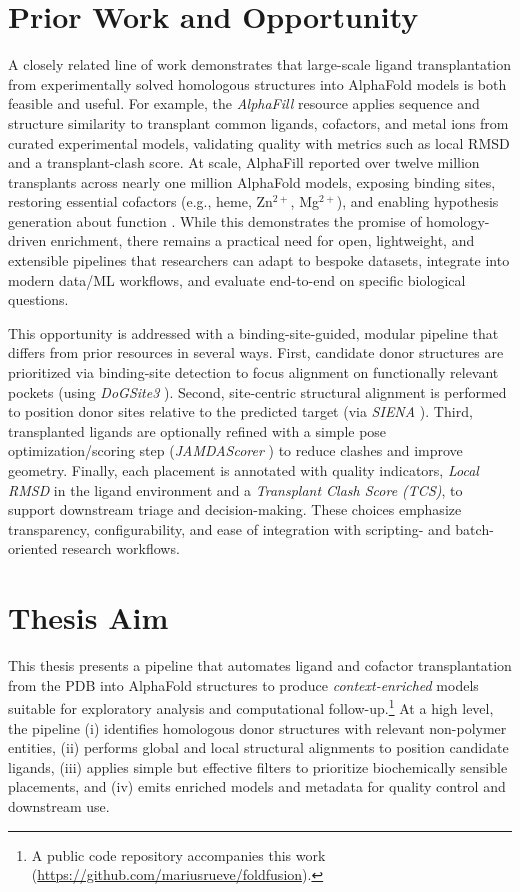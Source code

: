 \section{Prior Work and Opportunity}
A closely related line of work demonstrates that large-scale ligand transplantation from experimentally solved homologous structures into AlphaFold models is both feasible and useful. For example, the \textit{AlphaFill} resource applies sequence and structure similarity to transplant common ligands, cofactors, and metal ions from curated experimental models, validating quality with metrics such as local RMSD and a transplant-clash score. At scale, AlphaFill reported over twelve million transplants across nearly one million AlphaFold models, exposing binding sites, restoring essential cofactors (e.g., heme, Zn$^{2+}$, Mg$^{2+}$), and enabling hypothesis generation about function \cite{hekkelmanAlphaFillEnrichingAlphaFold2023}. While this demonstrates the promise of homology-driven enrichment, there remains a practical need for open, lightweight, and extensible pipelines that researchers can adapt to bespoke datasets, integrate into modern data/ML workflows, and evaluate end-to-end on specific biological questions.

This opportunity is addressed with a binding-site-guided, modular pipeline that differs from prior resources in several ways. First, candidate donor structures are prioritized via binding-site detection to focus alignment on functionally relevant pockets (using \emph{DoGSite3} \cite{graefBindingSiteDetection2023}). Second, site-centric structural alignment is performed to position donor sites relative to the predicted target (via \emph{SIENA} \cite{bietzSIENAEfficientCompilation2016}). Third, transplanted ligands are optionally refined with a simple pose optimization/scoring step (\emph{JAMDAScorer} \cite{flachsenbergConsistentSchemeGradientBased2020}) to reduce clashes and improve geometry. Finally, each placement is annotated with quality indicators, \emph{Local RMSD} in the ligand environment and a \emph{Transplant Clash Score (TCS)}, to support downstream triage and decision-making. These choices emphasize transparency, configurability, and ease of integration with scripting- and batch-oriented research workflows.

\section{Thesis Aim}
This thesis presents a pipeline that automates ligand and cofactor transplantation from the PDB into AlphaFold structures to produce \emph{context-enriched} models suitable for exploratory analysis and computational follow-up.\footnote{A public code repository accompanies this work (\url{https://github.com/mariusrueve/foldfusion}).} At a high level, the pipeline (i) identifies homologous donor structures with relevant non-polymer entities, (ii) performs global and local structural alignments to position candidate ligands, (iii) applies simple but effective filters to prioritize biochemically sensible placements, and (iv) emits enriched models and metadata for quality control and downstream use.

